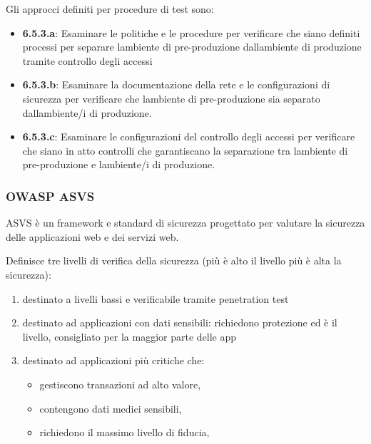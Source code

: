 Gli approcci definiti per procedure di test sono:

\begin{itemize}
\item
  \textbf{6.5.3.a}: Esaminare le politiche e le procedure per verificare
  che siano definiti processi per separare l\textquotesingle ambiente di
  pre-produzione dall\textquotesingle ambiente di produzione tramite
  controllo degli accessi
\item
  \textbf{6.5.3.b}: Esaminare la documentazione della rete e le
  configurazioni di sicurezza per verificare che
  l\textquotesingle ambiente di pre-produzione sia separato
  dall\textquotesingle ambiente/i di produzione.
\item
  \textbf{6.5.3.c}: Esaminare le configurazioni del controllo degli
  accessi per verificare che siano in atto controlli che garantiscano la
  separazione tra l\textquotesingle ambiente di pre-produzione e
  l\textquotesingle ambiente/i di produzione.
\end{itemize}

\subsubsection{OWASP ASVS}\label{owasp-asvs}

ASVS è un framework e standard di sicurezza progettato per valutare la
sicurezza delle applicazioni web e dei servizi web.

Definisce tre livelli di verifica della sicurezza (più è alto il livello
più è alta la sicurezza):

\begin{enumerate}
\def\labelenumi{\arabic{enumi}.}
\item
  destinato a livelli bassi e verificabile tramite penetration test
\item
  destinato ad applicazioni con dati sensibili: richiedono protezione ed
  è il livello, consigliato per la maggior parte delle app
\item
  destinato ad applicazioni più critiche che:

  \begin{itemize}
  \item
    gestiscono transazioni ad alto valore,
  \item
    contengono dati medici sensibili,
  \item
    richiedono il massimo livello di fiducia,
  \end{itemize}
\end{enumerate}

